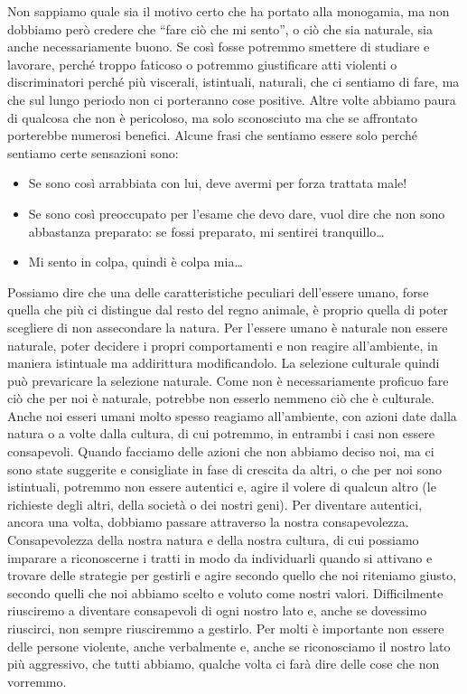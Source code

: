 \documentclass[12pt]{book} %
\begin{document}
Non sappiamo quale sia il motivo certo che ha portato alla monogamia, ma non dobbiamo però
credere che “fare ciò che mi sento”, o ciò che sia naturale, sia anche necessariamente buono. Se
così fosse potremmo smettere di studiare e lavorare, perché troppo faticoso o potremmo giustificare atti violenti o
discriminatori perché più viscerali, istintuali, naturali, che ci sentiamo di fare,
ma che sul lungo periodo non ci porteranno cose positive. Altre volte abbiamo paura di qualcosa che non è
pericoloso, ma solo sconosciuto ma che se affrontato porterebbe numerosi benefici. 
Alcune frasi che sentiamo essere solo perché sentiamo certe sensazioni sono:
\begin{itemize}
\item Se sono così arrabbiata con lui, deve avermi per forza trattata male! 
\item Se sono così preoccupato per l'esame che devo dare, vuol dire che non sono abbastanza preparato: se fossi preparato, mi sentirei tranquillo…
\item Mi sento in colpa, quindi è colpa mia…
\end{itemize}

Possiamo dire che una delle caratteristiche peculiari dell'essere umano, forse quella che più ci
distingue dal resto del regno animale, è proprio quella di poter scegliere di non assecondare la natura. Per l'essere
umano è naturale non essere naturale, poter decidere i propri comportamenti e non reagire
all'ambiente, in maniera istintuale ma addirittura modificandolo. La selezione culturale quindi
può prevaricare la selezione naturale. Come non è necessariamente proficuo fare ciò che per noi è naturale, potrebbe non esserlo
nemmeno ciò che è culturale. Anche noi esseri umani molto spesso reagiamo
all'ambiente, con azioni date dalla natura o a volte dalla cultura, di cui potremmo, in entrambi i
casi non essere consapevoli. Quando facciamo delle azioni che non abbiamo deciso noi, ma ci sono state suggerite e
consigliate in fase di crescita da altri, o che per noi sono istintuali, potremmo non essere autentici e, agire il
volere di qualcun altro (le richieste degli altri, della società o dei nostri geni). Per diventare autentici, ancora
una volta, dobbiamo passare attraverso la nostra consapevolezza. Consapevolezza della nostra natura e della nostra
cultura, di cui possiamo imparare a riconoscerne i tratti
in modo da individuarli quando si attivano e trovare delle strategie per gestirli e agire secondo quello
che noi riteniamo giusto, secondo quelli che noi abbiamo scelto e voluto come nostri valori. Difficilmente riusciremo a diventare consapevoli di ogni nostro lato e, anche se dovessimo riuscirci, non sempre riusciremmo a gestirlo. Per
molti è importante non essere delle persone violente, anche verbalmente e, anche se riconosciamo il nostro lato
più aggressivo, che tutti abbiamo, qualche volta ci farà dire delle cose che non vorremmo.
\end{document}
